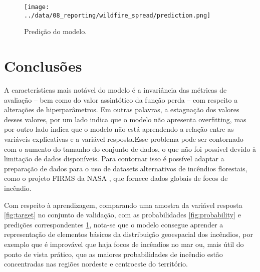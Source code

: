 \documentclass[journal]{IEEEtran}
\begin{document}
\begin{figure}[h]
        \centering
        \texttt{[image: ../data/08\_reporting/wildfire\_spread/prediction.png]}
        \caption{Predição do modelo.}
        \label{fig:prediction}
\end{figure}

\section{Conclusões}

A características mais notável do modelo é a invariância das métricas de avaliação -- bem como do valor assintótico da função perda -- com respeito a alterações de hiperparâmetros. Em outras palavras, a estagnação dos valores desses valores, por um lado indica que o modelo não apresenta overfitting, mas por outro lado indica que o modelo não está aprendendo a relação entre as variáveis explicativas e a variável resposta.Esse problema pode ser contornado com o aumento do tamanho do conjunto de dados, o que não foi possível devido à limitação de dados disponíveis. Para contornar isso é possível adaptar a preparação de dados para o uso de datasets alternativos de incêndios florestais, como o projeto FIRMS da NASA \cite{firms_1,firms_2,firms_3}, que fornece dados globais de focos de incêndio.\newline

Com respeito à aprendizagem, comparando uma amostra da variável resposta \ref{fig:target} no conjunto de validação, com as probabilidades \ref{fig:probability} e predições correspondentes \ref{fig:prediction}, nota-se que o modelo consegue aprender a representação de elementos básicos da distribuição geoespacial dos incêndios, por exemplo que é improvável que haja focos de incêndios no mar ou, mais útil do ponto de vista prático, que as maiores probabilidades de incêndio estão concentradas nas regiões nordeste e centroeste do território.



\end{document}
